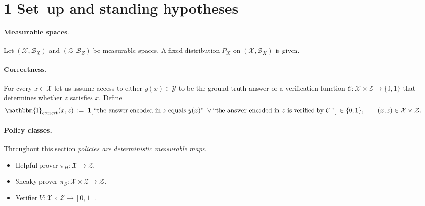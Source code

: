 \newcommand{\corr}{\mathbbm{1}_{\text{correct}}}
\newcommand{\one}{\mathbf 1}
\newcommand{\ip}[1]{\left\langle #1 \right\rangle}
\newcommand{\EE}{\mathbb E}
\newcommand{\PP}{\mathbb P}
\newcommand{\sig}{\sigma}
\newcommand{\BR}{\mathrm{BR}}
\newcommand{\argmax}{\mathop{\mathrm{arg\,max}}}
\newcommand{\argmin}{\mathop{\mathrm{arg\,min}}}
\newcommand{\dH}{\pi_H}
\newcommand{\dS}{\pi_S}
\newcommand{\dHt}{\tilde{\pi}_H}
\newcommand{\dSt}{\tilde{\pi}_S}


\section*{1 \; Set–up and standing hypotheses}

\paragraph{Measurable spaces.}
Let $(\mathcal X ,\mathcal B_{\!X})$ and $(\mathcal Z ,\mathcal B_{\!Z})$ be measurable spaces. A fixed distribution $P_X$ on $(\mathcal X ,\mathcal B_{\!X})$ is given.

\paragraph{Correctness.}
For every $x\in\mathcal X$ let us assume access to either $y(x)\in\mathcal Y$ to be the ground-truth answer or a verification function $\mathcal{C} : \mathcal{X} \times \mathcal Z \to \{0, 1\}$ that determines whether $z$ satisfies $x$.
Define
\[
\corr(x,z)\;:=\;\one\!\bigl[\,\text{``the answer encoded in $z$ equals }y(x)\text{'' }\lor\text{``the answer encoded in $z$ is verified by }\mathcal C\text{ ''}\bigr]\in\{0,1\},
\qquad
(x,z)\in\mathcal X\times\mathcal Z.
\]

\paragraph{Policy classes.}
Throughout this section \emph{policies are deterministic measurable maps.}

\smallskip
\begin{itemize}
\item Helpful prover $\dH :\mathcal X\to\mathcal Z$.
\item Sneaky prover $\dS :\mathcal X\times\mathcal Z\to\mathcal Z$.
\item Verifier $V:\mathcal X\times\mathcal Z\to[0,1]$.
\end{itemize}

